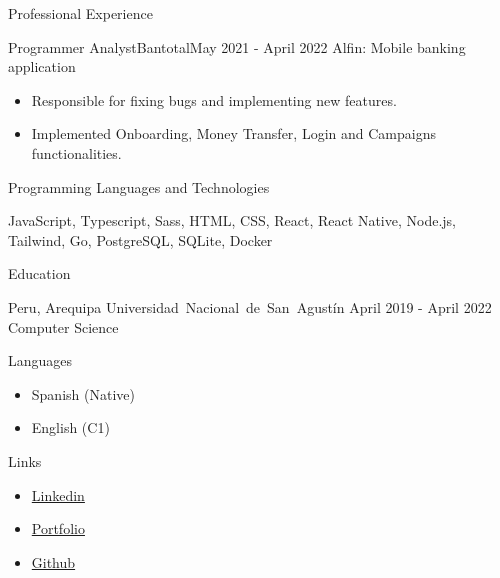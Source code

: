 \documentclass[]{mcdowell-cv/mcdowellcv}
\begin{document}
\begin{cvsection}{Professional Experience}
\begin{cvsubsection}{Programmer Analyst}{Bantotal}{May 2021 - April 2022}
            Alfin: Mobile banking application
            \begin{itemize}
                \item Responsible for fixing bugs and implementing new features.
                \item Implemented Onboarding, Money Transfer, Login and Campaigns functionalities.
            \end{itemize}

        \end{cvsubsection}
    \end{cvsection}

    \begin{cvsection}{Programming Languages and Technologies}
        \begin{cvsubsection}{}{}{}
            JavaScript, Typescript, Sass, HTML, CSS, React, React Native, Node.js, Tailwind, Go, PostgreSQL, SQLite, Docker
        \end{cvsubsection}
    \end{cvsection}

    \begin{cvsection}{Education}
        \begin{cvsubsection}
        {Peru, Arequipa}
        {\mbox{Universidad Nacional de San Agustín}}
        {April 2019 - April 2022}
            Computer Science
        \end{cvsubsection}
    \end{cvsection}

    \begin{cvsection}{Languages}
        \begin{cvsubsection}{}{}{}
            \begin{itemize}
                \item Spanish (Native)
                \item English (C1)
            \end{itemize}
        \end{cvsubsection}
    \end{cvsection}

    \begin{cvsection}{Links}
        \begin{cvsubsection}{}{}{}
            \begin{itemize}
                \item \href{https://www.linkedin.com/in/luis-angel-prado-postigo-813916231/}{Linkedin}
                \item \href{https://luis-prado-portfolio.netlify.app/}{Portfolio}
                \item \href{https://github.com/lpradopostigo}{Github}
            \end{itemize}
        \end{cvsubsection}
    \end{cvsection}
\end{document}
